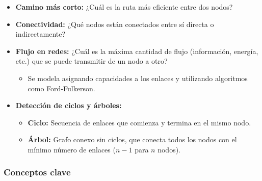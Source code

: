 \begin{itemize}
    \item \textbf{Camino más corto:} ¿Cuál es la ruta más eficiente entre dos nodos?
    \item \textbf{Conectividad:} ¿Qué nodos están conectados entre sí directa o indirectamente?
    \item \textbf{Flujo en redes:} ¿Cuál es la máxima cantidad de flujo (información, energía, etc.) que se puede transmitir de un nodo a otro?  
        \begin{itemize}
            \item Se modela asignando capacidades a los enlaces y utilizando algoritmos como Ford-Fulkerson.
        \end{itemize}
    \item \textbf{Detección de ciclos y árboles:}  
        \begin{itemize}
            \item \textbf{Ciclo:} Secuencia de enlaces que comienza y termina en el mismo nodo.
            \item \textbf{Árbol:} Grafo conexo sin ciclos, que conecta todos los nodos con el mínimo número de enlaces (\(n-1\) para \(n\) nodos).
        \end{itemize}
\end{itemize}

\subsubsection{Conceptos clave}

